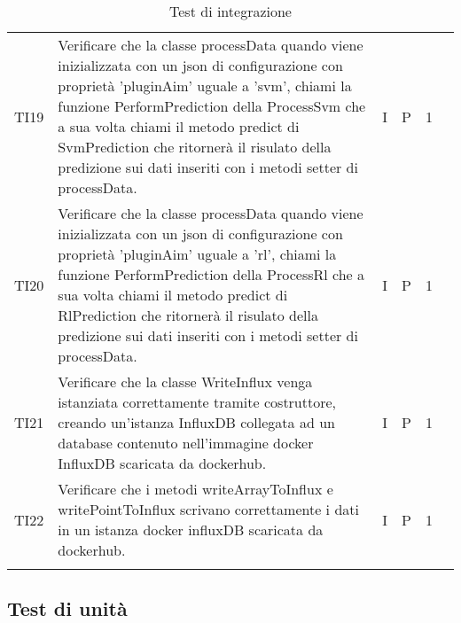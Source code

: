 \begin{longtable} {
		>{}p{12mm}
		>{}p{79.5mm}
		>{}p{9mm}
		>{}p{8mm}
		>{}p{14mm}
		>{}p{0mm}}
	TI19	& Verificare che la classe processData quando viene inizializzata con un json di configurazione con proprietà 'pluginAim' uguale a 'svm', chiami la funzione PerformPrediction della ProcessSvm che a sua volta chiami il metodo predict di SvmPrediction che ritornerà il risulato della predizione sui dati inseriti con i metodi setter di processData. & I & P & 1 & \TBstrut \\ [2mm]
	TI20	& Verificare che la classe processData quando viene inizializzata con un json di configurazione con proprietà 'pluginAim' uguale a 'rl', chiami la funzione PerformPrediction della ProcessRl che a sua volta chiami il metodo predict di RlPrediction che ritornerà il risulato della predizione sui dati inseriti con i metodi setter di processData. & I & P & 1 & \TBstrut \\ [2mm]
	TI21	& Verificare che la classe WriteInflux venga istanziata correttamente tramite costruttore, creando un'istanza InfluxDB collegata ad un database contenuto nell'immagine docker InfluxDB scaricata da dockerhub. & I & P & 1 & \TBstrut \\ [2mm]
	TI22	& Verificare che i metodi writeArrayToInflux e writePointToInflux scrivano correttamente i dati in un istanza docker influxDB scaricata da dockerhub. & I & P & 1 & \TBstrut \\ [2mm]

	\rowcolor{white}
	\caption{Test di integrazione}
\end{longtable}



\subsection{Test di unità}

